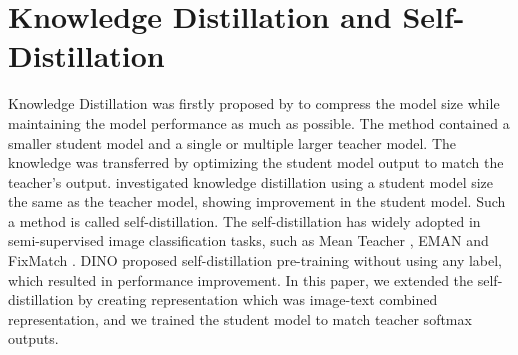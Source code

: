 \section{Knowledge Distillation and Self-Distillation}
Knowledge Distillation was firstly proposed by  to compress the model size while maintaining the model performance as much as possible.
The method contained a smaller student model and a single or multiple larger teacher model.
The knowledge was transferred by optimizing the student model output to match the teacher's output.
 investigated knowledge distillation using a student model size the same as the teacher model, showing improvement in the student model.
Such a method is called self-distillation.
The self-distillation has widely adopted in semi-supervised image classification tasks, such as Mean Teacher , EMAN  and FixMatch .
DINO  proposed self-distillation pre-training without using any label, which resulted in performance improvement.
In this paper, we extended the self-distillation by creating representation which was image-text combined representation, and we trained the student model to match teacher softmax outputs.




